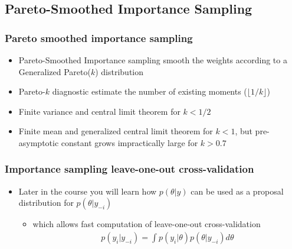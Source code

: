\documentclass[10pt]{beamer}
\begin{document}
\subsection{Pareto-Smoothed Importance Sampling}
\frame{\subsectionpage}


\begin{frame}

\frametitle{Pareto smoothed importance sampling}

  \begin{itemize}
  \item Pareto-Smoothed Importance sampling smooth the weights according to a Generalized Pareto($k$) distribution
  \item Pareto-$k$ diagnostic estimate the number of existing moments ($\lfloor 1/k \rfloor$)
  \item<2-> Finite variance and central limit theorem for $k<1/2$
  \item<3-> Finite mean and generalized central limit theorem for $k<1$,
    but pre-asymptotic constant grows impractically large for $k>0.7$
  \end{itemize}
\end{frame}

\begin{frame}

\frametitle{Importance sampling leave-one-out cross-validation}

  \begin{itemize}
  \item Later in the course you will learn how $p(\theta|y)$ can be
    used as a proposal distribution for $p(\theta|y_{-i})$
    \begin{itemize}
    \item which allows fast computation of leave-one-out cross-validation
      \begin{align*}
        p(y_i|y_{-i})=\int p(y_i|\theta) p(\theta|y_{-i}) d\theta
      \end{align*}
    \end{itemize}
  \end{itemize}

\end{frame}

%
%
%
\end{document}
